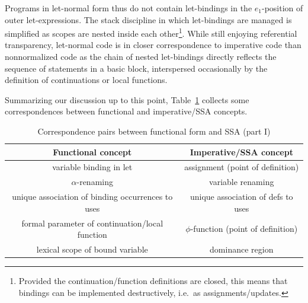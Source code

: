 Programs in let-normal form thus do not contain let-bindings in the
$e_1$-position of outer let-expressions. The stack discipline in which
let-bindings are managed is simplified as scopes are nested inside
each other\footnote{Provided the continuation/function definitions
are closed, this means that bindings can be implemented
destructively, i.e.~as assignments/updates.}. While still enjoying
referential transparency, let-normal code is in closer correspondence
to imperative code than nonnormalized code as the chain of nested
let-bindings directly reflects the sequence of statements in a basic
block, interspersed occasionally by the definition of continuations or
local functions.




Summarizing our discussion up to this point,
Table~\ref{tableFunctionalCorrespondencesZero} collects some
correspondences between functional and imperative/SSA concepts.
\begin{table}
\begin{tabular}{|c|c|}
  \hline Functional concept & Imperative/SSA concept\\ 
  \hline \hline
  variable binding in let & assignment (point of definition)\\
  $\alpha$-renaming & variable renaming\\
  unique association of binding occurrences to uses & unique
  association of defs to uses\\ 
  formal parameter of continuation/local function & 
    $\phi$-function (point of definition)\\ 
  lexical scope of bound variable & dominance region\\ 
  \hline
\end{tabular}
\caption{\label{tableFunctionalCorrespondencesZero}
  Correspondence pairs between functional form and SSA (part I)}
\end{table}

